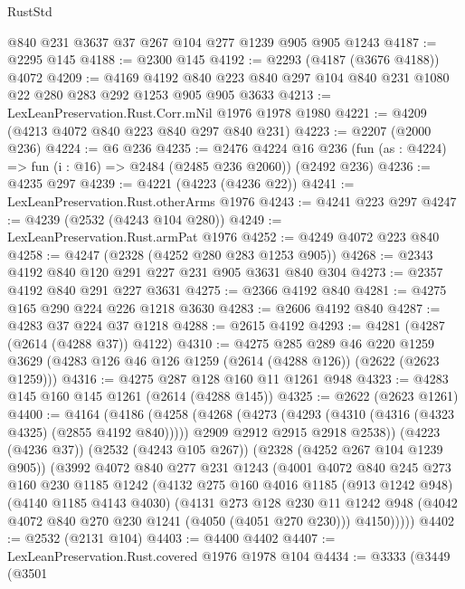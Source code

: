 \begin{lexlean}{RustStd}
\begin{coremodule}
    @840
    @231
    @3637
    @37
    @267
    @104
    @277
    @1239
    @905
    @905
    @1243
@4187 := @2295 @145
@4188 := @2300 @145
@4192 := @2293 (@4187 (@3676 @4188)) @4072
@4209 := @4169
    @4192
    @840
    @223
    @840
    @297
    @104
    @840
    @231
    @1080
    @22
    @280
    @283
    @292
    @1253
    @905
    @905
    @3633
@4213 := LexLeanPreservation.Rust.Corr.mNil @1976 @1978 @1980
@4221 := @4209 (@4213 @4072 @840 @223 @840 @297 @840 @231)
@4223 := @2207 (@2000 @236)
@4224 := @6 @236
@4235 := @2476
    @4224
    @16
    @236
    (fun (as : @4224) => fun (i : @16) => @2484 (@2485 @236 @2060))
    (@2492 @236)
@4236 := @4235 @297
@4239 := @4221 (@4223 (@4236 @22))
@4241 := LexLeanPreservation.Rust.otherArms @1976
@4243 := @4241 @223 @297
@4247 := @4239 (@2532 (@4243 @104 @280))
@4249 := LexLeanPreservation.Rust.armPat @1976
@4252 := @4249 @4072 @223 @840
@4258 := @4247 (@2328 (@4252 @280 @283 @1253 @905))
@4268 := @2343 @4192 @840 @120 @291 @227 @231 @905 @3631 @840 @304
@4273 := @2357 @4192 @840 @291 @227 @3631
@4275 := @2366 @4192 @840
@4281 := @4275 @165 @290 @224 @226 @1218 @3630
@4283 := @2606 @4192 @840
@4287 := @4283 @37 @224 @37 @1218
@4288 := @2615 @4192
@4293 := @4281 (@4287 (@2614 (@4288 @37)) @4122)
@4310 := @4275
    @285
    @289
    @46
    @220
    @1259
    @3629
    (@4283 @126 @46 @126 @1259 (@2614 (@4288 @126)) (@2622 (@2623 @1259)))
@4316 := @4275 @287 @128 @160 @11 @1261 @948
@4323 := @4283 @145 @160 @145 @1261 (@2614 (@4288 @145))
@4325 := @2622 (@2623 @1261)
@4400 := @4164
    (@4186
      (@4258
        (@4268
          (@4273 (@4293 (@4310 (@4316 (@4323 @4325) (@2855 @4192 @840)))))
          @2909
          @2912
          @2915
          @2918
          @2538))
      (@4223 (@4236 @37))
      (@2532 (@4243 @105 @267))
      (@2328 (@4252 @267 @104 @1239 @905))
      (@3992
        @4072
        @840
        @277
        @231
        @1243
        (@4001
          @4072
          @840
          @245
          @273
          @160
          @230
          @1185
          @1242
          (@4132
            @275
            @160
            @4016
            @1185
            (@913 @1242 @948)
            (@4140 @1185 @4143 @4030)
            (@4131
              @273
              @128
              @230
              @11
              @1242
              @948
              (@4042 @4072 @840 @270 @230 @1241 (@4050 (@4051 @270 @230)))
              @4150)))))
@4402 := @2532 (@2131 @104)
@4403 := @4400 @4402
@4407 := LexLeanPreservation.Rust.covered @1976 @1978 @104
@4434 := @3333
    (@3449
      (@3501

\end{coremodule}
\end{lexlean}
